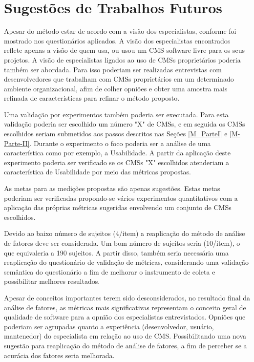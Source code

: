 
\section{Sugestões de Trabalhos Futuros}
\label{TrabalhosFuturos}

Apesar do método estar de acordo com a visão dos especialistas, conforme foi mostrado nos questionários aplicados. A visão dos especialistas encontrados reflete apenas a visão de quem usa, ou usou um CMS software livre para os seus projetos. A visão de especialistas ligados ao uso de CMSs proprietários poderia também ser abordada. Para isso poderiam ser realizadas entrevistas com desenvolvedores que trabalham com CMSs proprietários em um determinado ambiente organizacional, afim de colher opniões e obter uma amostra mais refinada de características para refinar o método proposto.

Uma validação por experimentos também poderia ser executada. Para esta validação poderia ser escolhido um número "X" de CMSs, e em seguida os CMSs escolhidos seriam submetidos aos passos descritos nas Seções \ref{M_ParteI} e \ref{M-Parte-II}. Durante o experimento o foco poderia ser a análise de uma característica como por exemplo, a Usabilidade. A partir da aplicação deste experimento poderia ser verificado se os CMSs "X" escolhidos atenderiam a característica de Usabilidade por meio das métricas propostas.

As metas para as medições propostas são apenas sugestões. Estas metas poderiam ser verificadas propondo-se vários experimentos quantitativos com a aplicação das próprias métricas sugeridas envolvendo um conjunto de CMSs escolhidos.

Devido ao baixo número de sujeitos (4/item) a reaplicação do método de análise de fatores deve ser considerada. Um bom número de sujeitos seria (10/item), o que equivaleria a 190 sujeitos. A partir disso, também seria necessária uma reaplicação do questionário de validação de métricas, considerando uma validação semântica do questionário a fim de melhorar o instrumento de coleta e possibilitar melhores resultados. 

Apesar de conceitos importantes terem sido desconsiderados, no resultado final da análise de fatores, as métricas mais significativas representam o conceito geral de qualidade de software para a opnião dos especialistas entrevistados. 
Opniões que poderiam ser agrupadas quanto a experiência (desenvolvedor, usuário, mantenedor) do especialista em relação ao uso de CMS. Possibilitando uma nova sugestão para reaplicação do método de análise de fatores, a fim de perceber se a acurácia dos fatores seria melhorada. 

